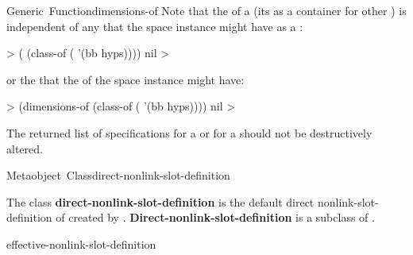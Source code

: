 \documentclass[10pt,twoside,english,pdftex]{article}
\begin{document}
\begin{functiondoc}{Generic~Function}{dimensions-of}
%
%
Note that the  of a  (its
 as a container for other ) is
independent of any  that the space instance might have
as a :
%
%
\W\supp
\begin{example}
  > ( (class-of ( '(bb hyps))))
  nil
  >
\end{example}
%
or the  that the  of the space instance
might have:
%
\W\supp\notpretop
\begin{example}
  > (dimensions-of (class-of ( '(bb hyps))))
  nil
  >
\end{example}

\fnnote The returned list of  specifications for a
 or for a  should not be destructively
altered.

\end{functiondoc}


\begin{functiondoc}{Metaobject~Class}{direct-nonlink-slot-definition}{}
%

\fnsyntax

\fnpackage {}

\fnmodule {}

\fndescription The class \textbf{direct-nonlink-slot-definition} is the
default direct nonlink-slot-definition  of
 created by \textbf{}.
\textbf{Direct-nonlink-slot-definition} is a subclass of
\textbf{}.

\begin{alsos}{effective-nonlink-slot-definition}
\end{alsos}

\end{functiondoc}

\end{document}

